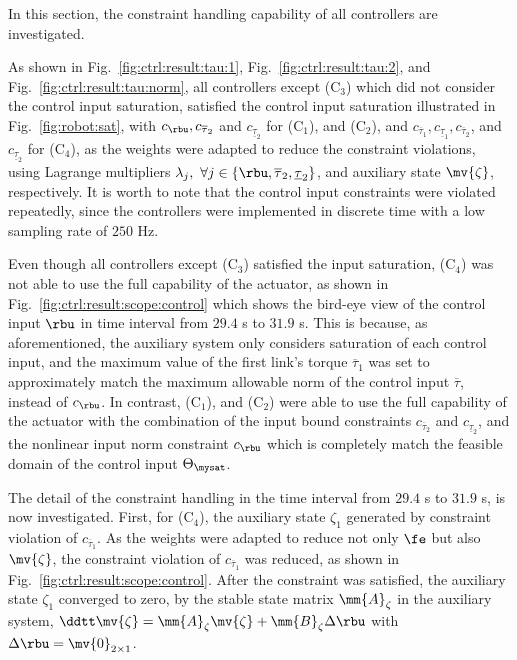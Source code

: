 \documentclass[lettersize,journal]{IEEEtran}
\begin{document}
In this section, the constraint handling capability of all controllers are investigated.

As shown in Fig.~\ref{fig:ctrl:result:tau:1}, Fig.~\ref{fig:ctrl:result:tau:2}, and Fig.~\ref{fig:ctrl:result:tau:norm}, all controllers except (C$_3$) which did not consider the control input saturation, satisfied the control input saturation illustrated in Fig.~\ref{fig:robot:sat}, with $c_{\rbu},c_{\overline\tau_2}$ and $c_{\underline\tau_2}$ for (C$_1$), and (C$_2$), and $c_{\overline\tau_1},c_{\underline\tau_1},c_{\overline\tau_2}$, and $c_{\underline\tau_2}$ for (C$_4$), as the weights were adapted to reduce the constraint violations, using Lagrange multipliers $\lambda_j,\ \forall j\in\{\rbu,\overline{\tau}_2,\underline{\tau}_2\}$, and auxiliary state $\mv{\zeta}$, respectively.
It is worth to note that the control input constraints were violated repeatedly, since the controllers were implemented in discrete time with a low sampling rate of $250$ Hz.

Even though all controllers except (C$_3$) satisfied the input saturation, (C$_4$) was not able to use the full capability of the actuator, as shown in Fig.~\ref{fig:ctrl:result:scope:control} which shows the bird-eye view of the control input $\rbu$ in time interval from $29.4$ s to $31.9$ s.
This is because, as aforementioned, the auxiliary system only considers saturation of each control input, and the maximum value of the first link's torque $\overline{\tau}_1$ was set to approximately match the maximum allowable norm of the control input $\overline\tau$, instead of $c_{\rbu}$.
In contrast, (C$_1$), and (C$_2$) were able to use the full capability of the actuator with the combination of the input bound constraints $c_{\overline\tau_2}$ and $c_{\underline\tau_2}$, and the nonlinear input norm constraint $c_{\rbu}$ which is completely match the feasible domain of the control input $\Theta_{\mysat}$.

The detail of the constraint handling in the time interval from $29.4$ s to $31.9$ s, is now investigated.
First, for (C$_4$), the auxiliary state $\zeta_1$ generated by constraint violation of $c_{\overline\tau_1}$. 
As the weights were adapted to reduce not only $\fe$ but also $\mv{\zeta}$, the constraint violation of $c_{\overline\tau_1}$ was reduced, as shown in Fig.~\ref{fig:ctrl:result:scope:control}.
After the constraint was satisfied, the auxiliary state $\zeta_1$ converged to zero, by the stable state matrix $\mm{A}_\zeta$ in the auxiliary system, \ie $\ddtt\mv{\zeta} = \mm{A}_\zeta \mv{\zeta} + \mm{B}_\zeta \Delta\rbu$ with $\Delta\rbu=\mv{0}_{2\times1}$.
\end{document}

